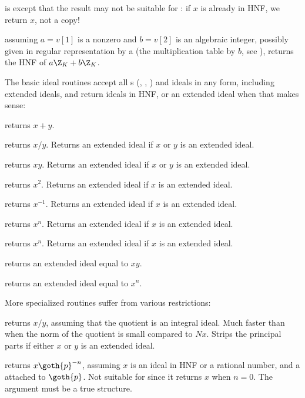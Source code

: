  is  except that the
result may not be suitable for : if $x$ is already in HNF, we
return $x$, not a copy!

 assuming $a = v[1]$ is a nonzero
 and $b = v[2]$ is an algebraic integer, possibly given in regular
representation by a  (the multiplication table by $b$, see
), returns the HNF of $a\Z_K+b\Z_K$.


The basic ideal routines accept all s (, ,
) and ideals in any form, including extended ideals, and return
ideals in HNF, or an extended ideal when that makes sense:

 returns $x+y$.

 returns $x/y$. Returns an extended
ideal if $x$ or $y$ is an extended ideal.

 returns $xy$.
Returns an extended ideal if $x$ or $y$ is an extended ideal.

 returns $x^2$.
Returns an extended ideal if $x$ is an extended ideal.

 returns $x^{-1}$.
Returns an extended ideal if $x$ is an extended ideal.

 returns $x^n$.
Returns an extended ideal if $x$ is an extended ideal.

 returns $x^n$.
Returns an extended ideal if $x$ is an extended ideal.

 returns an extended ideal equal
to $xy$.

 returns an extended ideal equal
to $x^n$.

More specialized routines suffer from various restrictions:

 returns $x/y$, assuming that
the quotient is an integral ideal. Much faster than  when the
norm of the quotient is small compared to $Nx$. Strips the principal parts
if either $x$ or $y$ is an extended ideal.

 returns $x
\goth{p}^{-n}$, assuming $x$ is an ideal in HNF or a rational number, and
 a  attached to $\goth{p}$. Not suitable for
 since it returns $x$ when $n = 0$.
The  argument must be a true  structure.

